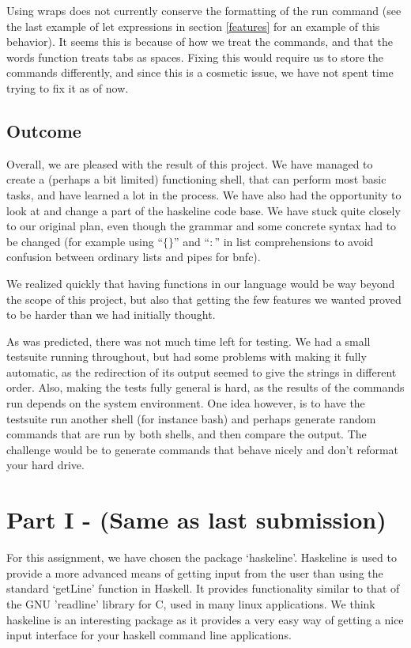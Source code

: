 \documentclass[11pt,a4paper]{article}
\begin{document}
Using wraps does not currently conserve the formatting of the run command (see
the last example of let expressions in section \ref{features} for an example of
this behavior). It seems this is because of how we treat the commands, and that
the words function treats tabs as spaces. Fixing this would require us to store
the commands differently, and since this is a cosmetic issue, we have not spent
time trying to fix it as of now.

\subsection{Outcome}

Overall, we are pleased with the result of this project. We have managed to
create a (perhaps a bit limited) functioning shell, that can perform most basic
tasks, and have learned a lot in the process. We have also had the opportunity
to look at and change a part of the haskeline code base. We have stuck quite
closely to our original plan, even though the grammar and some concrete syntax
had to be changed (for example using ``$\{\}$'' and ``$:$'' in list comprehensions
to avoid confusion between ordinary lists and pipes for bnfc).

We realized quickly that having functions in our language would be way beyond
the scope of this project, but also that getting the few features we wanted
proved to be harder than we had initially thought.

As was predicted, there was not much time left for testing. We had a small
testsuite running throughout, but had some problems with making it fully
automatic, as the redirection of its output seemed to give the strings in
different order. Also, making the tests fully general is hard, as the results
of the commands run depends on the system environment. One idea however, is
to have the testsuite run another shell (for instance bash) and perhaps
generate random commands that are run by both shells, and then compare the
output. The challenge would be to generate commands that behave nicely and don't
reformat your hard drive.








\newpage
\appendix

\section{Part I - (Same as last submission)}
For this assignment, we have chosen the package ‘haskeline’. Haskeline is used
to provide a more advanced means of getting input from the user than using the
standard ‘getLine’ function in Haskell. It provides functionality similar to
that of the GNU 'readline' library for C, used in many linux applications. We
think haskeline is an interesting package as it provides a very easy way of
getting a nice input interface for your haskell command line applications.
\end{document}
